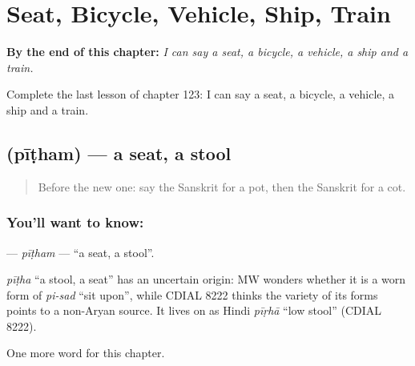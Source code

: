 
\chapter{Seat, Bicycle, Vehicle, Ship, Train}
\label{ch:sa-seat-bicycle-vehicle-ship-train}

\begin{chapteropening}
\textbf{By the end of this chapter:} \emph{I can say a seat, a bicycle, a vehicle, a ship and a train.}

Complete the last lesson of chapter 123: I can say a seat, a bicycle, a vehicle, a ship and a train.
\end{chapteropening}

\section[\texorpdfstring{\sk{पीठम्} (pīṭham)}{पीठम् (pīṭham)}]{ (pīṭham) — a seat, a stool}

\label{lesson:SA-C123-pitham}



\begin{quote}
Before the new one: say the Sanskrit for a pot, then the Sanskrit for a cot.
\end{quote}

\subsection*{You'll want to know: }
\textbf{} — \emph{pīṭham} — \textquotedblleft{}a seat, a stool\textquotedblright{}.

\begin{cousinweb}
\emph{pīṭha} \textquotedblleft{}a stool, a seat\textquotedblright{} has an uncertain origin: MW wonders whether it is a worn form of \emph{pi-sad} \textquotedblleft{}sit upon\textquotedblright{}, while CDIAL 8222 thinks the variety of its forms points to a non-Aryan source. It lives on as Hindi \emph{pīṛhā} \textquotedblleft{}low stool\textquotedblright{} (CDIAL 8222).
\end{cousinweb}

\begin{grammarlens}[title={What you've built}]
One more word for this chapter.
\end{grammarlens}

